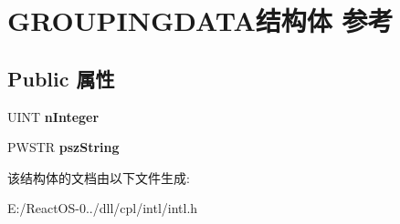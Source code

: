\hypertarget{struct_g_r_o_u_p_i_n_g_d_a_t_a}{}\section{G\+R\+O\+U\+P\+I\+N\+G\+D\+A\+T\+A结构体 参考}
\label{struct_g_r_o_u_p_i_n_g_d_a_t_a}
\subsection*{Public 属性}
\begin{DoxyCompactItemize}
\item 
\mbox{\label{struct_g_r_o_u_p_i_n_g_d_a_t_a_a38f6096a843ac95fce9a748019ad15da}} 
U\+I\+NT {\bfseries n\+Integer}
\item 
\mbox{\label{struct_g_r_o_u_p_i_n_g_d_a_t_a_a9e0d3f93800651bee3885200d580865b}} 
P\+W\+S\+TR {\bfseries psz\+String}
\end{DoxyCompactItemize}


该结构体的文档由以下文件生成\+:\begin{DoxyCompactItemize}
\item 
E\+:/\+React\+O\+S-\/0../dll/cpl/intl/intl.\+h\end{DoxyCompactItemize}
